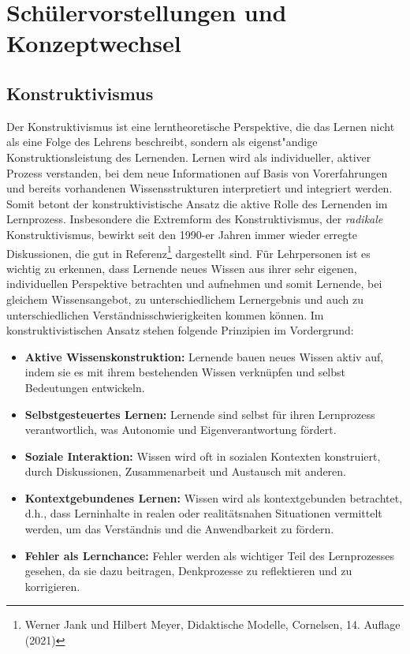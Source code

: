 \chapter{Sch{\"u}lervorstellungen und Konzeptwechsel}\label{Schuelervorstellungen}


\section{Konstruktivismus}\label{Konstruktivismus}

Der Konstruktivismus ist eine lerntheoretische Perspektive, die das Lernen nicht als eine Folge des Lehrens beschreibt, sondern als eigenst"{a}ndige Konstruktionsleistung des Lernenden. Lernen wird als individueller, aktiver Prozess verstanden, bei dem neue Informationen auf Basis von Vorerfahrungen und bereits vorhandenen Wissensstrukturen interpretiert und integriert werden. Somit betont der konstruktivistische Ansatz  die aktive Rolle des Lernenden im Lernprozess. Insbesondere die Extremform des Konstruktivismus, der \emph{radikale} Konstruktivismus, bewirkt  seit den 1990-er Jahren immer wieder erregte Diskussionen, die gut in Referenz\footnote{Werner Jank und Hilbert Meyer, Didaktische Modelle, Cornelsen, 14. Auflage (2021)} dargestellt sind. F\"{u}r Lehrpersonen ist es wichtig zu erkennen, dass Lernende neues Wissen aus ihrer sehr eigenen, individuellen Perspektive betrachten und aufnehmen und somit Lernende, bei gleichem Wissensangebot, zu unterschiedlichem Lernergebnis und auch zu unterschiedlichen Verst\"{a}ndnisschwierigkeiten kommen k\"{o}nnen.
\bip
Im konstruktivistischen Ansatz stehen folgende Prinzipien im Vordergrund:

\begin{itemize}
\item \textbf{Aktive Wissenskonstruktion:} Lernende bauen neues Wissen aktiv auf, indem sie es mit ihrem bestehenden Wissen verkn\"{u}pfen und selbst Bedeutungen entwickeln.
\item \textbf{Selbstgesteuertes Lernen:} Lernende sind selbst f\"{u}r ihren Lernprozess verantwortlich, was Autonomie und Eigenverantwortung f\"{o}rdert.
\item \textbf{Soziale Interaktion:} Wissen wird oft in sozialen Kontexten konstruiert, durch Diskussionen, Zusammenarbeit und Austausch mit anderen.
\item \textbf{Kontextgebundenes Lernen:} Wissen wird als kontextgebunden betrachtet, d.h., dass Lerninhalte in realen oder realit\"{a}tsnahen Situationen vermittelt werden, um das Verst\"{a}ndnis und die Anwendbarkeit zu f\"{o}rdern.
\item \textbf{Fehler als Lernchance:} Fehler werden als wichtiger Teil des Lernprozesses gesehen, da sie dazu beitragen, Denkprozesse zu reflektieren und zu korrigieren.
\end{itemize}

